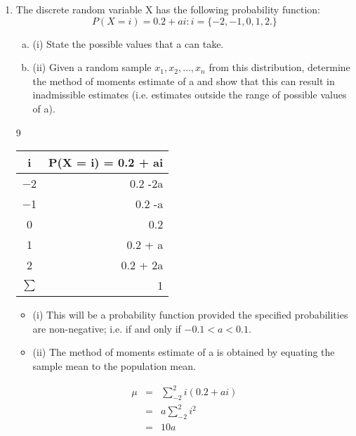 \documentclass[a4paper,12pt]{article}
\begin{document}
\begin{enumerate}
\item The discrete random variable X has the following probability function:
\[P(X = i) = 0.2 + ai : i = \{-2, -1, 0, 1, 2.\}\]

\begin{enumerate}[(a)]
\item (i) State the possible values that a can take. 
\item (ii) Given a random sample $x_1 , x_2 , \ldots , x_n$ from this distribution, determine
the method of moments estimate of a and show that this can result in
inadmissible estimates (i.e. estimates outside the range of possible
values of a). 
\end{enumerate}
9 


\begin{center}
\begin{tabular}{|c|r|}
i & P(X = i) = 0.2 + ai  \\ \hline
−2 &   0.2 -2a\\ \hline
−1 &   0.2 -a\\ \hline
0  &  0.2 \\ \hline
1  &  0.2  + a\\ \hline
2  &  0.2 + 2a\\ \hline \hline
$\sum$ & 1 \\ \hline
\end{tabular}
\end{center}
\begin{itemize} 
\item (i) This will be a probability function provided the specified probabilities are
non-negative; i.e. if and only if $-0.1 < a < 0.1$.
\item (ii) The method of moments estimate of a is obtained by equating the sample
mean to the population mean. 

\end{itemize}



\begin{eqnarray*} 
\mu &=& \sum^{2}_{-2} i(0.2 + ai) \\
&=& a \sum^{2}_{-2} i^2 \\
&=& 10a \\
\end{eqnarray*}



\end{enumerate}
\end{document}
